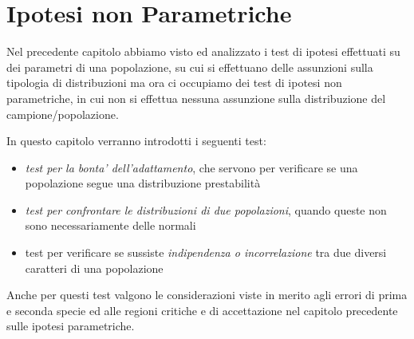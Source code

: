\chapter{Ipotesi non Parametriche}
Nel precedente capitolo abbiamo visto ed analizzato i test di ipotesi effettuati su dei parametri di una popolazione, su
cui si effettuano delle assunzioni sulla tipologia di distribuzioni ma ora ci occupiamo dei test di ipotesi non
parametriche, in cui non si effettua nessuna assunzione sulla distribuzione del campione/popolazione.  

In questo capitolo verranno introdotti i seguenti test:
\begin{itemize}
    \item \emph{test per la bonta' dell'adattamento}, che servono per verificare se una popolazione segue una distribuzione prestabilità
    \item \emph{test per confrontare le distribuzioni di due popolazioni}, quando queste non sono necessariamente delle normali
    \item test per verificare se sussiste \emph{indipendenza o incorrelazione} tra due diversi caratteri di una popolazione
\end{itemize}
Anche per questi test valgono le considerazioni viste in merito agli errori di prima e seconda specie ed alle regioni
critiche e di accettazione nel capitolo precedente sulle ipotesi parametriche.

